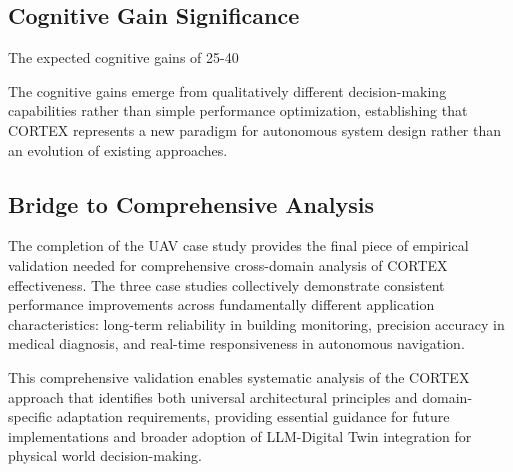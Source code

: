 \subsection{Cognitive Gain Significance}

The expected cognitive gains of 25-40%

The cognitive gains emerge from qualitatively different decision-making capabilities rather than simple performance optimization, establishing that CORTEX represents a new paradigm for autonomous system design rather than an evolution of existing approaches.

\subsection{Bridge to Comprehensive Analysis}

The completion of the UAV case study provides the final piece of empirical validation needed for comprehensive cross-domain analysis of CORTEX effectiveness. The three case studies collectively demonstrate consistent performance improvements across fundamentally different application characteristics: long-term reliability in building monitoring, precision accuracy in medical diagnosis, and real-time responsiveness in autonomous navigation.

This comprehensive validation enables systematic analysis of the CORTEX approach that identifies both universal architectural principles and domain-specific adaptation requirements, providing essential guidance for future implementations and broader adoption of LLM-Digital Twin integration for physical world decision-making.


